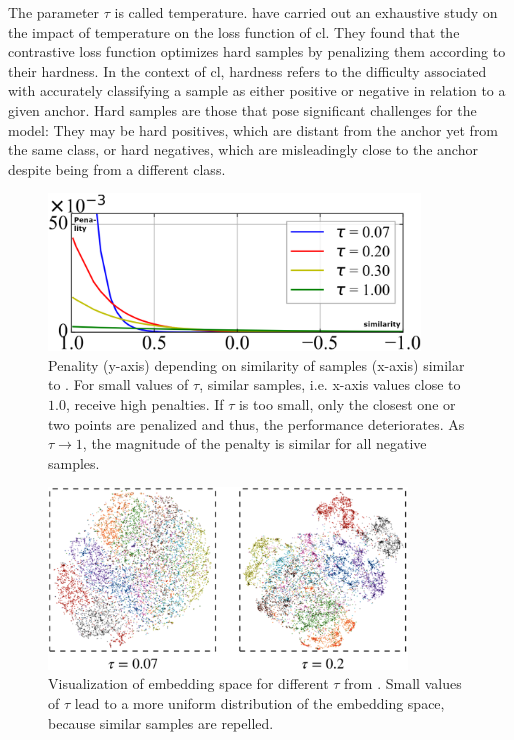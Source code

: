 The parameter $\tau$ is called temperature.
\citet{CL_temp_2021} have carried out an exhaustive study on the impact of temperature on the loss function of \ac{cl}.
They found that the contrastive loss function optimizes hard samples by penalizing them according to their hardness.
In the context of \ac{cl}, hardness refers to the difficulty associated with accurately classifying 
a sample as either positive or negative in relation to a given anchor.
Hard samples are those that pose significant challenges for the model: 
They may be hard positives, which are distant from the anchor yet from the same class, 
or hard negatives, which are misleadingly close to the anchor despite being from a different class.

\begin{figure}[!htb] %
    \centering
    \includegraphics[width=280pt]{images/gradient_ratio_dep_on_temperature_legend.png}
    \caption{Penality (y-axis) depending on similarity of samples (x-axis) similar to \citet{CL_temp_2021}. 
    For small values of $\tau$, similar samples, i.e. x-axis values close to $1.0$, receive high penalties.
    If $\tau$ is too small, only the closest one or two points are penalized and thus, the performance deteriorates.
    As $\tau \rightarrow 1$, the magnitude of the penalty is similar for all negative samples.
    }
    \label{fig:gradient_ratio_dep_on_temperature}
\end{figure}

\begin{figure}[!htbp] %
    \centering
    \includegraphics[width=270pt]{images/tsne_dep_on_temperature.png}
    \caption{Visualization of embedding space for different $\tau$ from \citet{CL_temp_2021}.
    Small values of $\tau$ lead to a more uniform distribution of the embedding space, 
    because similar samples are repelled.
    }
    \label{fig:tsne_dep_on_temperature}
\end{figure}

